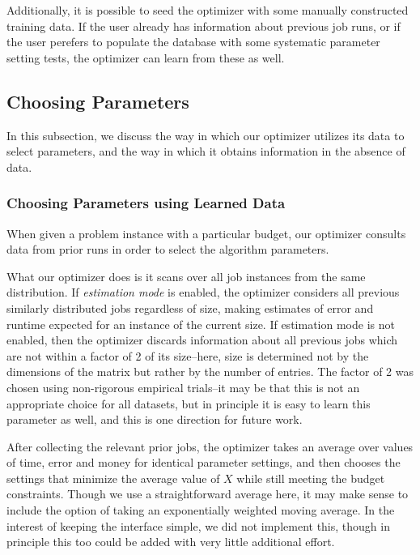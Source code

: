 Additionally, it is possible to seed the optimizer with some manually
constructed training data. If the user already has information about 
previous job runs, or if the user perefers to populate the database
with some systematic parameter setting tests, the optimizer can learn
from these as well. 


\subsection{Choosing Parameters}

In this subsection, we discuss the way in which our optimizer utilizes
its data to select parameters, and the way in which it obtains information
in the absence of data. 

\subsubsection{Choosing Parameters using Learned Data}
When given a problem instance with a particular budget, our optimizer
consults data from prior runs in order to select the algorithm 
parameters.

What our optimizer does is it scans over all job instances
from the same distribution. If {\em estimation mode} is enabled, 
the optimizer
considers all previous similarly distributed jobs regardless of size, 
making estimates of error and runtime expected for an instance 
of the current size. If estimation mode is not enabled, then the optimizer
discards information about all previous jobs which are not within a
factor of 2 of its size--here, size is determined not by the dimensions
of the matrix but rather by the number of entries. The factor of 2 was 
chosen using non-rigorous empirical trials--it may be that this is not
an appropriate choice for all datasets, but in principle it is easy to
learn this parameter as well, and this is one direction for future work.  

After collecting the relevant prior jobs, 
the optimizer takes an average over values of
time, error and money for identical parameter settings, 
and then chooses the settings that minimize the average value of $X$ while
still meeting the budget constraints. Though we use a straightforward
average here, it may make sense to include the option of taking an
exponentially weighted moving average. In the interest of keeping the
interface simple, we did not implement this, though in principle this too 
could be added with very little additional effort. 

